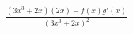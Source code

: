 \documentclass[preview]{standalone}
\begin{document}
\begin{align*}
\frac{(3x^3+2x)(2x)-f(x)g'(x)}{(3x^3+2x)^2}
\end{align*}
\end{document}
